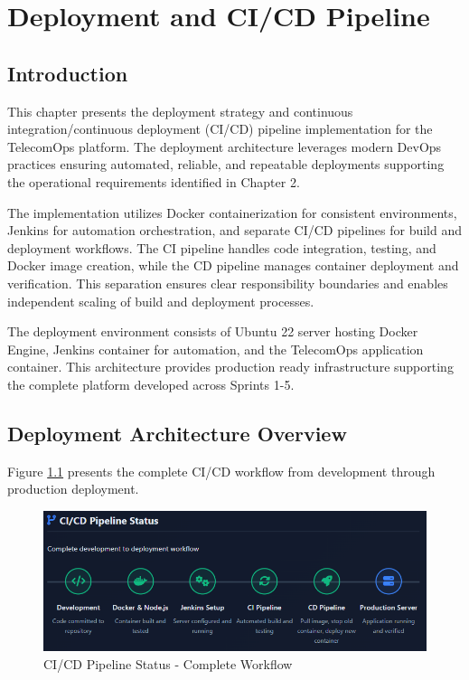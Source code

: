 \chapter{Deployment and CI/CD Pipeline}

\cfoot{\thepage}

\parindent=0.5in
\onehalfspacing

\section{Introduction}

This chapter presents the deployment strategy and continuous integration/continuous deployment (CI/CD) pipeline implementation for the TelecomOps platform. The deployment architecture leverages modern DevOps practices ensuring automated, reliable, and repeatable deployments supporting the operational requirements identified in Chapter 2.

The implementation utilizes Docker containerization for consistent environments, Jenkins for automation orchestration, and separate CI/CD pipelines for build and deployment workflows. The CI pipeline handles code integration, testing, and Docker image creation, while the CD pipeline manages container deployment and verification. This separation ensures clear responsibility boundaries and enables independent scaling of build and deployment processes.

The deployment environment consists of Ubuntu 22 server hosting Docker Engine, Jenkins container for automation, and the TelecomOps application container. This architecture provides production ready infrastructure supporting the complete platform developed across Sprints 1-5.

\section{Deployment Architecture Overview}

Figure \ref{fig:cicd_workflow} presents the complete CI/CD workflow from development through production deployment.

\begin{figure}[H]
    \centering
    \includegraphics[width=0.95\linewidth]{img/chap_08/deployment_architecture.png}
    \caption{CI/CD Pipeline Status - Complete Workflow}
    \label{fig:cicd_workflow}
\end{figure}

